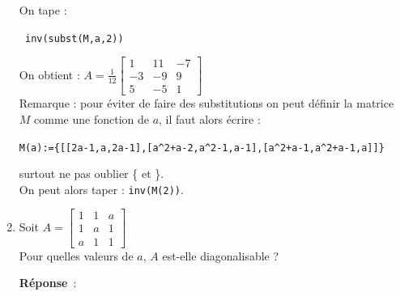 \documentclass{article}
\begin{document}
\begin{enumerate}
On tape :
\begin{center}
\verb| inv(subst(M,a,2))|
\end{center}
On obtient :
$A=\frac{1}{12}\left[ 
\begin{array}{ccc}
1 & 11 & -7\\
-3 & -9 & 9\\
5 & -5 & 1
\end{array}
\right]$\\
Remarque : pour \'eviter de faire des substitutions on peut d\'efinir la matrice $M$ comme une fonction de $a$, il faut alors \'ecrire :
\begin{center}
\verb|M(a):={[[2a-1,a,2a-1],[a^2+a-2,a^2-1,a-1],[a^2+a-1,a^2+a-1,a]]}|
\end{center}
surtout ne pas oublier \{ et \}.\\
On peut alors taper : \verb|inv(M(2))|.

\item Soit $A=\left[ 
\begin{array}{ccc}
1 & 1 & a\\
1 & a & 1\\
a & 1 & 1
\end{array}
\right]$\\
Pour quelles valeurs de $a$, $A$ est-elle diagonalisable ?

{\bf R\'eponse}~:\\


\end{enumerate}
\end{document}

